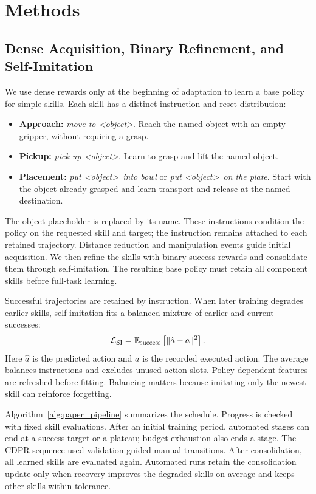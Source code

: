 \section{Methods}\label{sec:method}


\subsection{Dense Acquisition, Binary Refinement, and Self-Imitation}\label{sec:skill_acquisition}
We use dense rewards only at the beginning of adaptation to learn a base policy for simple skills. Each skill has a distinct instruction and reset distribution:
\begin{itemize}
\item \textbf{Approach:} \emph{move to \textless object\textgreater}. Reach the named object with an empty gripper, without requiring a grasp.
\item \textbf{Pickup:} \emph{pick up \textless object\textgreater}. Learn to grasp and lift the named object.
\item \textbf{Placement:} \emph{put \textless object\textgreater\ into bowl} or \emph{put \textless object\textgreater\ on the plate}. Start with the object already grasped and learn transport and release at the named destination.
\end{itemize}
The object placeholder is replaced by its name. These instructions condition the policy on the requested skill and target; the instruction remains attached to each retained trajectory. Distance reduction and manipulation events guide initial acquisition. We then refine the skills with binary success rewards and consolidate them through self-imitation. The resulting base policy must retain all component skills before full-task learning.

Successful trajectories are retained by instruction. When later training degrades earlier skills, self-imitation fits a balanced mixture of earlier and current successes:
\begin{equation}
\mathcal L_{\rm SI}=\mathbb E_{\rm success}
\left[\|\hat a-a\|^2\right].
\label{eq:si_loss}
\end{equation}
Here $\hat a$ is the predicted action and $a$ is the recorded executed action. The average balances instructions and excludes unused action slots. Policy-dependent features are refreshed before fitting. Balancing matters because imitating only the newest skill can reinforce forgetting.

Algorithm~\ref{alg:paper_pipeline} summarizes the schedule. Progress is checked with fixed skill evaluations. After an initial training period, automated stages can end at a success target or a plateau; budget exhaustion also ends a stage. The CDPR sequence used validation-guided manual transitions. After consolidation, all learned skills are evaluated again. Automated runs retain the consolidation update only when recovery improves the degraded skills on average and keeps other skills within tolerance.


